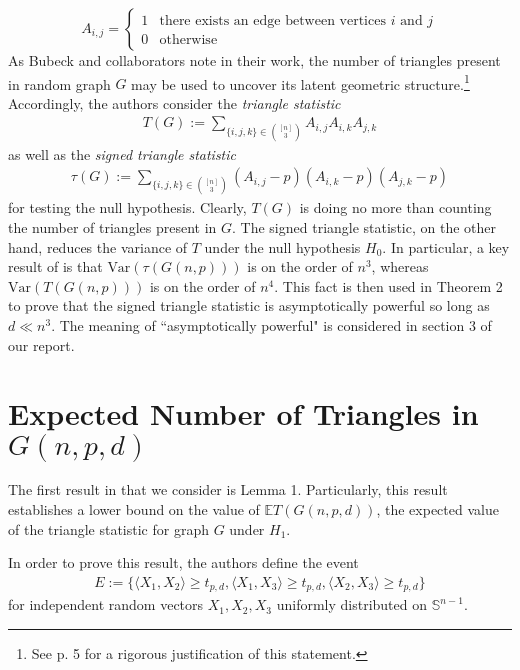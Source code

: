\documentclass{article}
\begin{document}
\[ A_{i, j} = \begin{cases} 
      1 & \text{there exists an edge between vertices $i$ and $j$} \\
      0 & \text{otherwise} 
   \end{cases}
\]
As Bubeck and collaborators note in their work, the number of triangles present in random graph $G$ may be used to uncover its latent geometric structure.\footnote{See p. 5 for a rigorous justification of this statement.} Accordingly, the authors consider the \textit{triangle statistic}
\begin{align}
    T(G) := \sum\limits_{\{i,j,k\} \in \binom{[n]}{3}} A_{i,j} A_{i,k} A_{j,k}
\end{align}
as well as the \textit{signed triangle statistic}
\begin{align}
    \tau(G) := \sum\limits_{\{i,j,k\} \in \binom{[n]}{3}} (A_{i,j} - p)(A_{i,k} - p) (A_{j,k} - p)
\end{align}
for testing the null hypothesis. Clearly, $T(G)$ is doing no more than counting the number of triangles present in $G$. The signed triangle statistic, on the other hand, reduces the variance of $T$ under the null hypothesis $H_0$. In particular, a key result of \cite{bubeck2016testing} is that $\text{Var}(\tau(G(n,p)))$ is on the order of $n^3$, whereas $\text{Var}(T(G(n,p)))$ is on the order of $n^4$. This fact is then used in Theorem 2 to prove that the signed triangle statistic is asymptotically powerful so long as $d \ll n^3$. The meaning of ``asymptotically powerful" is considered in section 3 of our report.

\section{Expected Number of Triangles in $G(n, p, d)$}

The first result in \cite{bubeck2016testing} that we consider is Lemma 1. Particularly, this result establishes a lower bound on the value of $\mathbb{E}T(G(n,p,d))$, the expected value of the triangle statistic for graph $G$ under $H_1$. 

In order to prove this result, the authors define the event 
\begin{align*}
    E := \bigg\{ \langle X_1, X_2 \rangle \geq t_{p,d}, \langle X_1, X_3 \rangle \geq t_{p,d},  \langle X_2, X_3 \rangle \geq  t_{p,d} \bigg\}
\end{align*}
for independent random vectors $X_1, X_2, X_3$  uniformly distributed on $\mathbb{S}^{n-1}$. 
\end{document}
